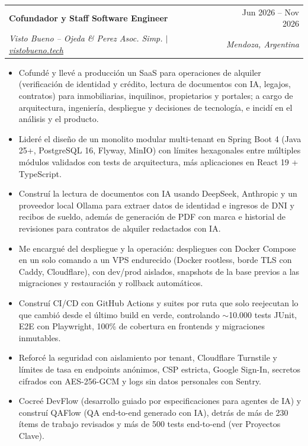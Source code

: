 \documentclass[letterpaper,11pt]{article}
\makeatletter
\newcommand{\resumeItem}[1]{
  \item\small{
    {#1 \vspace{-1pt}}
  }
}
\newcommand{\resumeSubheading}[4]{
  \needspace{4\baselineskip}\vspace{-1pt}\item
    \begin{tabular*}{0.97\textwidth}[t]{l@{\extracolsep{\fill}}r}
      \textbf{#1} & #2 \\
      \textit{\small#3} & \textit{\small #4} \\
    \end{tabular*}\vspace{-5pt}
}
\newcommand{\resumeItemListStart}{\begin{itemize}}
\newcommand{\resumeItemListEnd}{\end{itemize}\vspace{-3pt}}
\makeatother
\begin{document}
\resumeSubheading
  {Cofundador y Staff Software Engineer}{Jun 2026 -- Nov 2026}
  {Visto Bueno -- Ojeda \& Perez Asoc. Simp. $|$ \href{https://vistobueno.tech}{\underline{vistobueno.tech}}}{Mendoza, Argentina}
  \resumeItemListStart
    \resumeItem{Cofundé y llevé a producción un SaaS para operaciones de alquiler (verificación de identidad y crédito, lectura de documentos con IA, legajos, contratos) para inmobiliarias, inquilinos, propietarios y portales; a cargo de arquitectura, ingeniería, despliegue y decisiones de tecnología, e incidí en el análisis y el producto.}
    \resumeItem{Lideré el diseño de un monolito modular multi-tenant en Spring Boot 4 (Java 25+, PostgreSQL 16, Flyway, MinIO) con límites hexagonales entre múltiples módulos validados con tests de arquitectura, más aplicaciones en React 19 + TypeScript.}
    \resumeItem{Construí la lectura de documentos con IA usando DeepSeek, Anthropic y un proveedor local Ollama para extraer datos de identidad e ingresos de DNI y recibos de sueldo, además de generación de PDF con marca e historial de revisiones para contratos de alquiler redactados con IA.}
    \resumeItem{Me encargué del despliegue y la operación: despliegues con Docker Compose en un solo comando a un VPS endurecido (Docker rootless, borde TLS con Caddy, Cloudflare), con dev/prod aislados, snapshots de la base previos a las migraciones y restauración y rollback automáticos.}
    \resumeItem{Construí CI/CD con GitHub Actions y suites por ruta que solo reejecutan lo que cambió desde el último build en verde, controlando $\sim$10.000 tests JUnit, E2E con Playwright, 100\% de cobertura en frontends y migraciones inmutables.}
    \resumeItem{Reforcé la seguridad con aislamiento por tenant, Cloudflare Turnstile y límites de tasa en endpoints anónimos, CSP estricta, Google Sign-In, secretos cifrados con AES-256-GCM y logs sin datos personales con Sentry.}
    \resumeItem{Cocreé DevFlow (desarrollo guiado por especificaciones para agentes de IA) y construí QAFlow (QA end-to-end generado con IA), detrás de más de 230 ítems de trabajo revisados y más de 500 tests end-to-end (ver Proyectos Clave).}
  \resumeItemListEnd
\end{document}
